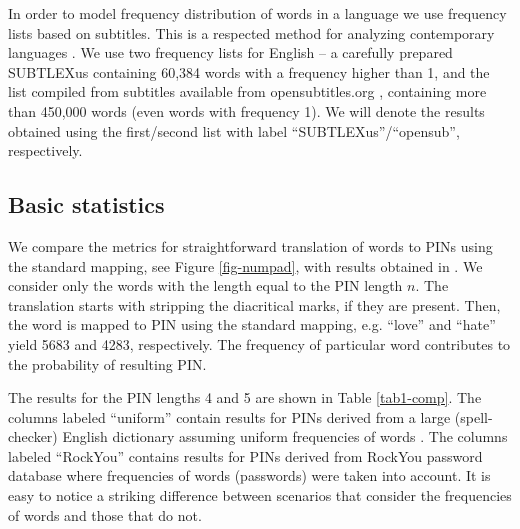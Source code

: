 \documentclass[a4paper, 11pt]{article}
\begin{document}
In order to model frequency distribution of words in a language we use frequency lists based on subtitles.
This is a respected method for analyzing contemporary languages \cite{BN09}. We use two frequency lists for
English -- a carefully prepared SUBTLEXus \cite{SUBTLEXus} containing 60,384 words with a frequency 
higher than 1, and the list compiled from subtitles available from opensubtitles.org \cite{opensub}, 
containing more than 450,000 words (even words with frequency 1). We will denote the results obtained using 
the first/second list with label ``SUBTLEXus''/``opensub'', respectively.

\subsection{Basic statistics}

We compare the metrics for straightforward translation of words to PINs using the standard mapping, see Figure \ref{fig-numpad}, with results obtained in \cite{SS13}. We consider only the words with the 
length equal to the PIN length $n$. The translation starts with stripping the diacritical marks, if they are present. 
Then, the word is mapped to PIN using the standard mapping, e.g. ``love'' and ``hate'' yield 5683 and 4283,
respectively. The frequency of particular word contributes to the probability of resulting PIN.

The results for the PIN lengths 4 and 5 are shown in Table \ref{tab1-comp}. The columns labeled ``uniform''
contain results for PINs derived from a large (spell-checker) English dictionary assuming uniform frequencies 
of words \cite{SS13}. The columns labeled ``RockYou'' contains results for PINs derived from RockYou password 
database where frequencies of words (passwords) were taken into account. It is easy to notice a striking 
difference between scenarios that consider the frequencies of words and those that do not. 
\end{document}
